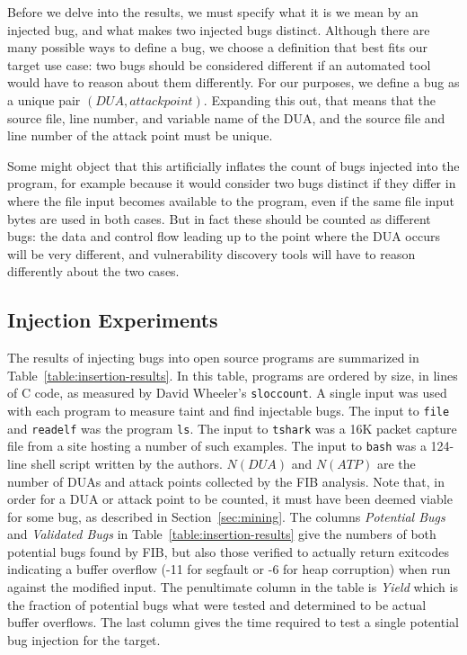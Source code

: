 Before we delve into the results, we must specify what it is we mean by an injected bug, and what makes two injected bugs distinct. Although there are many possible ways to define a bug, we choose a definition that best fits our target use case: two bugs should be considered different if an automated tool would have to reason about them differently. For our purposes, we define a bug as a unique pair $(DUA, attack point)$. Expanding this out, that means that the source file, line number, and variable name of the DUA, and the source file and line number of the attack point must be unique.

Some might object that this artificially inflates the count of bugs injected into the program, for example because it would consider two bugs distinct if they differ in where the file input becomes available to the program, even if the same file input bytes are used in both cases. But in fact these should be counted as different bugs: the data and control flow leading up to the point where the DUA occurs will be very different, and vulnerability discovery tools will have to reason differently about the two cases.

\subsection{Injection Experiments}
\label{sec:results:subsec:injection}

The results of injecting bugs into open source programs are summarized in Table~\ref{table:insertion-results}.
In this table, programs are ordered by size, in lines of C code, as measured by David Wheeler's \verb+sloccount+.
A single input was used with each program to measure taint and find injectable bugs.
The input to \verb+file+ and \verb+readelf+ was the program \verb+ls+.
The input to \verb+tshark+ was a 16K packet capture file from a site hosting a number of such examples.  %
The input to \verb+bash+ was a 124-line shell script written by the authors.
$N(DUA)$ and $N(ATP)$ are the number of DUAs and attack points collected by the FIB analysis.
Note that, in order for a DUA or attack point to be counted, it must have been deemed viable for some bug, as described in Section~\ref{sec:mining}.
The columns \emph{Potential Bugs} and \emph{Validated Bugs} in Table~\ref{table:insertion-results} give the numbers of both potential bugs found by FIB, but also those verified to actually return exitcodes indicating a buffer overflow (-11 for segfault or -6 for heap corruption) when run against the modified input.
The penultimate column in the table is \emph{Yield} which is the fraction of potential bugs what were tested and determined to be actual buffer overflows.
The last column gives the time required to test a single potential bug injection for the target.


